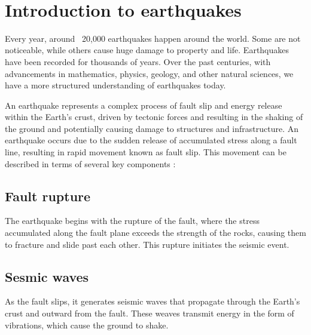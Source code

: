 ~\\

\section{Introduction to earthquakes}
Every year, around ~20,000 earthquakes happen around the world. Some are not noticeable, while others cause huge damage to property and life.
Earthquakes have been recorded for thousands of years. 
Over the past centuries, with advancements in mathematics, physics, geology, and other natural sciences, we have a more structured understanding of earthquakes today.

An earthquake represents a complex process of fault slip and energy release within the Earth's crust, driven by tectonic forces and resulting in the shaking of the ground and potentially causing damage to structures and infrastructure. 
An earthquake occurs due to the sudden release of accumulated stress along a fault line, resulting in rapid movement known as fault slip. This movement can be described in terms of several key components \citep{Hiroo_Kanamori_2004}:

\subsection{Fault rupture}
The earthquake begins with the rupture of the fault, where the stress accumulated along the fault plane exceeds the strength of the rocks, causing them to fracture and slide past each other. This rupture initiates the seismic event.

\subsection{Sesmic waves} 
As the fault slips, it generates seismic waves that propagate through the Earth's crust and outward from the fault.
These weaves transmit energy in the form of vibrations, which cause the ground to shake.

